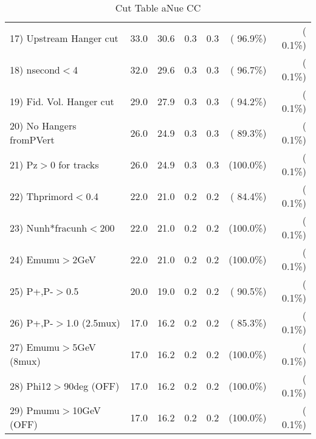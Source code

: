 \begin{table}[h!]
\begin{tabular}{||l||r|r|r|r|r|r||}
 17) Upstream Hanger cut  &         33.0 &         30.6 &          0.3 &          0.3 & ( 96.9\%) & (  0.1\%) \\
 18) nsecond$<$4          &         32.0 &         29.6 &          0.3 &          0.3 & ( 96.7\%) & (  0.1\%) \\
 19) Fid. Vol. Hanger cut &         29.0 &         27.9 &          0.3 &          0.3 & ( 94.2\%) & (  0.1\%) \\
 20) No Hangers fromPVert &         26.0 &         24.9 &          0.3 &          0.3 & ( 89.3\%) & (  0.1\%) \\
 21) Pz$>$0 for tracks    &         26.0 &         24.9 &          0.3 &          0.3 & (100.0\%) & (  0.1\%) \\
 22) Thprimord$<$0.4      &         22.0 &         21.0 &          0.2 &          0.2 & ( 84.4\%) & (  0.1\%) \\
 23) Nunh*fracunh$<$200   &         22.0 &         21.0 &          0.2 &          0.2 & (100.0\%) & (  0.1\%) \\
 24) Emumu$>$2GeV         &         22.0 &         21.0 &          0.2 &          0.2 & (100.0\%) & (  0.1\%) \\
 25) P+,P-$>$0.5          &         20.0 &         19.0 &          0.2 &          0.2 & ( 90.5\%) & (  0.1\%) \\
 26) P+,P-$>$1.0 (2.5mux) &         17.0 &         16.2 &          0.2 &          0.2 & ( 85.3\%) & (  0.1\%) \\
 27) Emumu$>$5GeV  (8mux) &         17.0 &         16.2 &          0.2 &          0.2 & (100.0\%) & (  0.1\%) \\
 28) Phi12$>$90deg  (OFF) &         17.0 &         16.2 &          0.2 &          0.2 & (100.0\%) & (  0.1\%) \\
 29) Pmumu$>$10GeV  (OFF) &         17.0 &         16.2 &          0.2 &          0.2 & (100.0\%) & (  0.1\%) \\
 \hline
 \hline
 \end{tabular}
 \caption{Cut Table  aNue CC  }
 \label{tab-cutcohjpsi-mumu_anuecc}
 \end{table}
